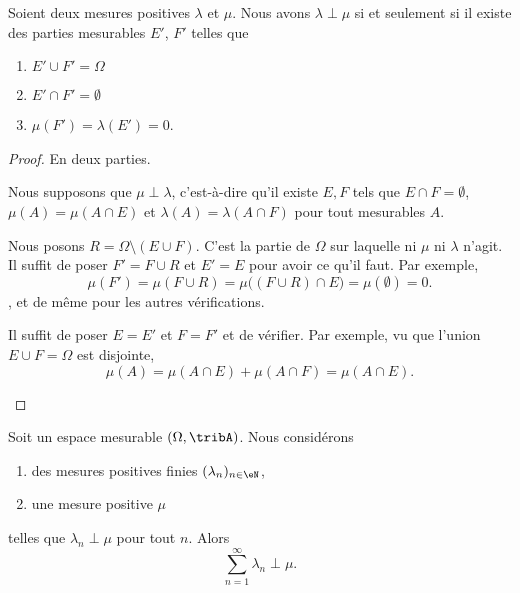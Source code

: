 \begin{lemma}		\label{LEMooDIGPooJqEwGl}
	Soient deux mesures positives \( \lambda\) et \( \mu\). Nous avons \( \lambda\perp\mu \) si et seulement si il existe des parties mesurables \( E'\), \( F'\) telles que
	\begin{enumerate}
		\item
		      $E'\cup F'=\Omega$
		\item
		      \( E'\cap F'=\emptyset\)
		\item
		      \( \mu(F')=\lambda(E')=0\).
	\end{enumerate}
\end{lemma}

\begin{proof}
	En deux parties.
	\begin{subproof}
		\spitem[\( \Rightarrow\)]
		Nous supposons que \( \mu\perp\lambda\), c'est-à-dire qu'il existe \( E,F\) tels que \( E\cap F=\emptyset\), \( \mu(A)=\mu(A\cap E)\) et \( \lambda(A)=\lambda(A\cap F)\) pour tout mesurables \( A\).

		Nous posons \( R=\Omega\setminus(E\cup F)\). C'est la partie de \( \Omega\) sur laquelle ni \( \mu\) ni \( \lambda\) n'agit. Il suffit de poser \( F'=F\cup R\) et \( E'=E\) pour avoir ce qu'il faut. Par exemple,
		\begin{equation}
			\mu(F')=\mu(F\cup R)=\mu\big( (F\cup R)\cap E \big)=\mu(\emptyset)=0.
		\end{equation},
		et de même pour les autres vérifications.

		\spitem[\( \Leftarrow\)]
		Il suffit de poser \( E=E'\) et \( F=F'\) et de vérifier. Par exemple, vu que l'union \( E\cup F=\Omega\) est disjointe,
		\begin{equation}
			\mu(A)=\mu(A\cap E)+\mu(A\cap F)=\mu(A\cap E).
		\end{equation}
	\end{subproof}
\end{proof}

\begin{lemma}		\label{LEMooVOJDooFgbwSE}
	Soit un espace mesurable \( (\Omega,\tribA)\). Nous considérons
	\begin{enumerate}
		\item
		      des mesures positives finies \( (\lambda_n)_{n\in \eN}\),
		\item
		      une mesure positive \( \mu\)
	\end{enumerate}
	telles que \( \lambda_n\perp\mu\) pour tout \( n\). Alors
	\begin{equation}
		\sum_{n=1}^{\infty}\lambda_n\perp\mu.
	\end{equation}
\end{lemma}


